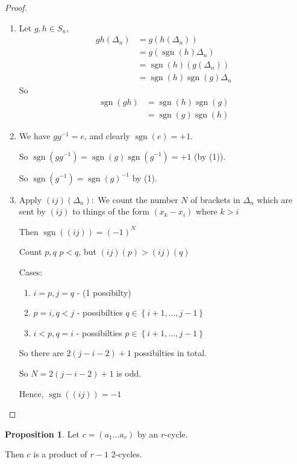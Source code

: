 \documentclass{article}
\theoremstyle{definition}
\newtheorem{proposition}{Proposition}
\newcommand{\dtn}{\Delta_n}
\DeclareMathOperator{\sgn}{sgn}
\begin{document}
\begin{proof}
  \begin{enumerate}
    \item Let $g,h \in S_n$,
      \begin{align*}
        gh(\dtn) &= g(h(\dtn)) \\
                 &= g(\sgn(h)\dtn) \\
                 &= \sgn(h)(g(\dtn)) \\
                 &= \sgn(h) \sgn(g) \dtn
      \end{align*}
      So 
      \begin{align*}
        \sgn(gh) &= \sgn(h)\sgn(g) \\
                 &= \sgn(g)\sgn(h)
      \end{align*}

    \item We have $g g^{-1}=e$, and clearly $\sgn(e) = +1$. 

      So $\sgn(g g^{-1})=\sgn(g)\sgn(g^{-1})=+1$ (by (1)).

      So $\sgn(g^{-1})=\sgn(g)^{-1}$ by (1).

    \item Apply $(ij)(\dtn):$
      We count the number $N$ of brackets in $\dtn$ which are sent by $(ij)$ to things of the form $(x_k - x_i)$ where $k>i$ 

      Then $\sgn\left( (ij) \right)=(-1)^N$

      Count $p,q$ $p<q$, but $(ij)(p)>(ij)(q)$

      Cases: 
      \begin{enumerate}
        \item $i=p, j=q$ - (1 possibilty)
        \item $p=i,q<j$ - possibilties $q \in \left\{ i+1, \ldots, j-1 \right\}$
        \item $i<p,q=i$ - possibilties $p \in \left\{ i+1, \ldots , j-1 \right\}$
      \end{enumerate}
      So there are $2(j-i-2) +1$ possibilties in total.

      So $N=2(j-i-2)+1$ is odd. 

      Hence, $\sgn\left( (ij) \right)=-1$
  \end{enumerate}
\end{proof}

\begin{proposition}
  \label{prp:rcycle}
  Let $c=(a_1 \ldots a_r)$ by an $r$-cycle. 

  Then $c$ is a product of $r-1$ 2-cycles.
\end{proposition}
\end{document}
